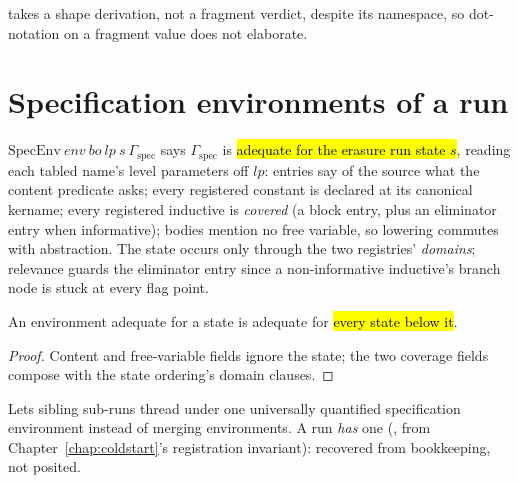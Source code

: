 \begin{remark}
  takes a shape derivation, not a fragment verdict, despite
its namespace, so dot-notation on a fragment value does not elaborate.
\end{remark}

\section{Specification environments of a run}
\label{sec:source:specenv}

\begin{definition}
\label{def:SpecEnv}
\leanok
{}
 $\mathrm{SpecEnv}\ env\ bo\ lp\ s\ \Gamma_{\mathrm{spec}}$ says $\Gamma_{\mathrm{spec}}$
is \hl{adequate for the erasure run state $s$}, reading each tabled name's level parameters off
$lp$: entries say of the source what the content predicate asks; every registered constant is
declared at its canonical kername; every registered inductive is \emph{covered} (a block entry,
plus an eliminator entry when informative); bodies mention no free variable, so lowering commutes
with abstraction.
 The state occurs only through the two registries' \emph{domains}; relevance guards the
eliminator entry since a non-informative inductive's branch node is stuck at every flag point.
\end{definition}

\begin{lemma}
\label{lem:SpecEnv-mono}
\leanok
{}
 An environment adequate for a state is adequate for \hl{every state below it}.
\end{lemma}
\begin{proof}
\leanok
{}
 Content and free-variable fields ignore the state; the two coverage fields compose
with the state ordering's domain clauses.
\end{proof}

\begin{remark}
 Lets sibling sub-runs thread under one universally quantified specification
environment instead of merging environments. A run \emph{has} one (, from
Chapter~\ref{chap:coldstart}'s registration invariant): recovered from bookkeeping, not posited.
\end{remark}

